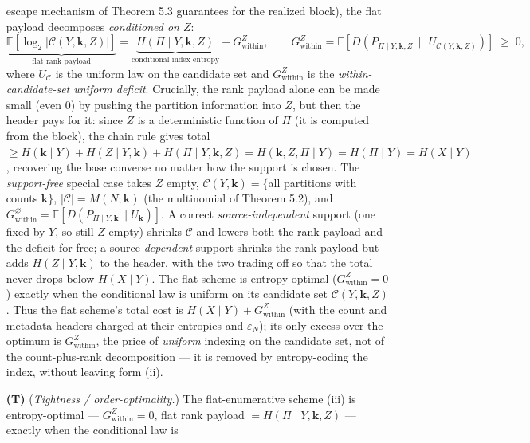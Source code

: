 \documentclass[
]{article}
\begin{document}
\begin{itemize}
escape mechanism of Theorem 5.3 guarantees for the realized block), the
flat payload decomposes \emph{conditioned on $Z$}:
\[
\underbrace{\mathbb{E}\!\left[\log_2 |\mathcal{C}(Y, \mathbf{k}, Z)|\right]}_{\text{flat rank payload}} = \underbrace{H(\Pi \mid Y, \mathbf{k}, Z)}_{\text{conditional index entropy}} + G_{\mathrm{within}}^{Z},
\qquad
G_{\mathrm{within}}^{Z} = \mathbb{E}\!\left[D\!\left(P_{\Pi \mid Y, \mathbf{k}, Z} \,\big\|\, U_{\mathcal{C}(Y, \mathbf{k}, Z)}\right)\right] \;\geq\; 0,
\]
where $U_{\mathcal{C}}$ is the uniform law on the candidate set and
$G_{\mathrm{within}}^{Z}$ is the \emph{within-candidate-set uniform
deficit}. Crucially, the rank payload alone can be made small (even $0$)
by pushing the partition information into $Z$, but then the header pays
for it: since $Z$ is a deterministic function of $\Pi$ (it is computed
from the block), the chain rule gives total
$\geq H(\mathbf{k} \mid Y) + H(Z \mid Y, \mathbf{k}) + H(\Pi \mid Y, \mathbf{k}, Z) = H(\mathbf{k}, Z, \Pi \mid Y) = H(\Pi \mid Y) = H(X \mid Y)$,
recovering the base converse no matter how the support is chosen. The
\emph{support-free} special case takes $Z$ empty,
$\mathcal{C}(Y, \mathbf{k}) = \{$all partitions with counts $\mathbf{k}\}$,
$|\mathcal{C}| = M(N; \mathbf{k})$ (the multinomial of Theorem 5.2), and
$G_{\mathrm{within}}^{\varnothing} = \mathbb{E}[D(P_{\Pi \mid Y, \mathbf{k}} \| U_{\mathbf{k}})]$.
A correct \emph{source-independent} support (one fixed by $Y$, so still
$Z$ empty) shrinks $\mathcal{C}$ and lowers both the rank payload and the
deficit for free; a source-\emph{dependent} support shrinks the rank
payload but adds $H(Z \mid Y, \mathbf{k})$ to the header, with the two
trading off so that the total never drops below $H(X \mid Y)$. The flat
scheme is entropy-optimal ($G_{\mathrm{within}}^{Z} = 0$) exactly when the
conditional law is uniform on its candidate set
$\mathcal{C}(Y, \mathbf{k}, Z)$. Thus the flat scheme's total cost is
$H(X \mid Y) + G_{\mathrm{within}}^{Z}$ (with the count and metadata
headers charged at their entropies and $\varepsilon_N$); its only excess
over the optimum is $G_{\mathrm{within}}^{Z}$, the price of \emph{uniform}
indexing on the candidate set, not of the count-plus-rank decomposition
--- it is removed by entropy-coding the index, without leaving form (ii).
\item[\textbf{(T)}] (\emph{Tightness / order-optimality.}) The
flat-enumerative scheme (iii) is entropy-optimal ---
$G_{\mathrm{within}}^{Z} = 0$, flat rank payload
$= H(\Pi \mid Y, \mathbf{k}, Z)$ --- exactly when the conditional law is

\end{itemize}
\end{document}
